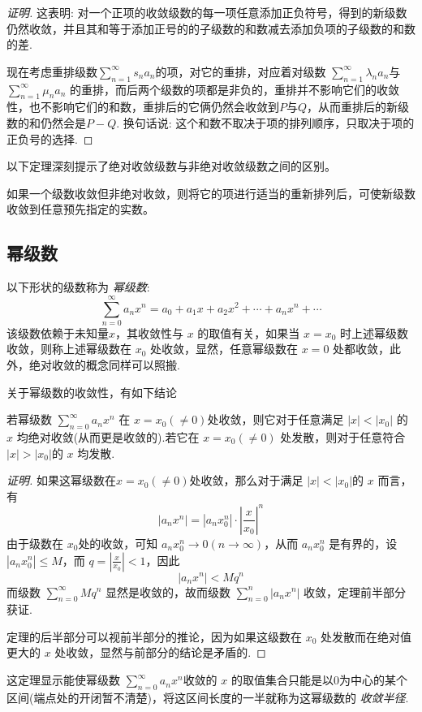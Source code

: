 \begin{proof}[证明]
  这表明: 对一个正项的收敛级数的每一项任意添加正负符号，得到的新级数仍然收敛，并且其和等于添加正号的的子级数的和数减去添加负项的子级数的和数的差.

  现在考虑重排级数$\sum_{n=1}^{\infty}s_na_n$的项，对它的重排，对应着对级数 $\sum_{n=1}^{\infty}\lambda_na_n$与$\sum_{n=1}^{\infty}\mu_na_n$ 的重排，而后两个级数的项都是非负的，重排并不影响它们的收敛性，也不影响它们的和数，重排后的它俩仍然会收敛到$P$与$Q$，从而重排后的新级数的和仍然会是$P-Q$. 换句话说: 这个和数不取决于项的排列顺序，只取决于项的正负号的选择.
\end{proof}

以下定理深刻提示了绝对收敛级数与非绝对收敛级数之间的区别。
\begin{theorem}[黎曼定理]
  如果一个级数收敛但非绝对收敛，则将它的项进行适当的重新排列后，可使新级数收敛到任意预先指定的实数。
\end{theorem}

\subsection{幂级数}
\label{sec:power-series}

以下形状的级数称为 \emph{幂级数}:
\[ \sum_{n=0}^{\infty} a_nx^n = a_0+a_1x+a_2x^2+\cdots + a_nx^n+\cdots \]
该级数依赖于未知量$x$，其收敛性与 $x$ 的取值有关，如果当 $x=x_0$ 时上述幂级数收敛，则称上述幂级数在 $x_0$ 处收敛，显然，任意幂级数在 $x=0$ 处都收敛，此外，绝对收敛的概念同样可以照搬.

关于幂级数的收敛性，有如下结论
\begin{theorem}
  若幂级数 $\sum_{n=0}^{\infty}a_nx^n$ 在 $x=x_0(\neq 0)$处收敛，则它对于任意满足 $|x|<|x_0|$ 的 $x$ 均绝对收敛(从而更是收敛的).若它在 $x=x_0(\neq 0)$ 处发散，则对于任意符合 $|x|>|x_0|$的 $x$ 均发散.
\end{theorem}

\begin{proof}[证明]
  如果这幂级数在$x=x_0(\neq 0)$处收敛，那么对于满足 $|x|<|x_0|$的 $x$ 而言，有
  \[ |a_nx^n| = |a_nx_0^n| \cdot \left| \frac{x}{x_0} \right|^n \]
  由于级数在 $x_0$处的收敛，可知 $a_nx_0^n \to 0 (n \to \infty)$，从而 $a_nx_0^n$ 是有界的，设 $|a_nx_0^n| \leqslant M$，而 $q=\left| \frac{x}{x_0} \right| < 1$，因此
  \[ |a_nx^n| < Mq^n \]
  而级数 $\sum_{n=0}^{\infty} Mq^n$ 显然是收敛的，故而级数 $\sum_{n=0}^n|a_nx^n|$ 收敛，定理前半部分获证.

  定理的后半部分可以视前半部分的推论，因为如果这级数在 $x_0$ 处发散而在绝对值更大的 $x$ 处收敛，显然与前部分的结论是矛盾的.
\end{proof}

这定理显示能使幂级数 $\sum_{n=0}^{\infty} a_nx^n$收敛的 $x$ 的取值集合只能是以$0$为中心的某个区间(端点处的开闭暂不清楚)，将这区间长度的一半就称为这幂级数的 \emph{收敛半径}.

